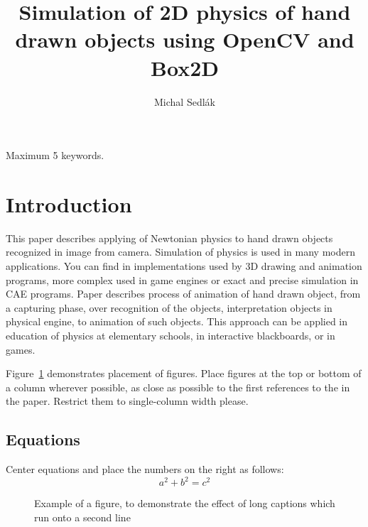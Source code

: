 \documentclass{ifacconf}
\begin{document}
\begin{frontmatter}
\title{Simulation of 2D physics of hand drawn objects using OpenCV and Box2D}
\author[Bratislava]{Michal Sedlák}
\address[Bratislava]{Faculty of Electrical Engineering and Information Technology, Slovak University of Technology,
Ilkovičova 3, 812 19 Bratislava, Slovakia
\\
(e-mail: michal.sedlak@stuba.sk)}
\begin{abstract}

\end{abstract}
\begin{keyword}
Maximum 5 keywords.
\end{keyword}
\end{frontmatter}

\section{Introduction}
This paper describes applying of Newtonian physics to hand drawn objects
recognized in image from camera. Simulation of physics is used in many modern applications. You can find in implementations used by 3D drawing and animation programs, more complex used in game engines or exact and precise simulation in CAE programs. Paper describes process of animation of hand drawn object, from a capturing phase, over recognition of the objects, interpretation objects in physical engine, to animation of such objects. This approach can be applied in education of physics at elementary schools, in interactive blackboards, or in games.



Figure~\ref{fig:song} demonstrates placement of figures. Place figures at
the top or bottom of a column wherever possible, as close as possible
to the first references to the in the paper. Restrict them to
single-column width please.

\subsection{Equations}
Center equations and place the numbers on the right as follows:
\begin{equation}
a^2+b^2=c^2
\end{equation}

\begin{figure}
\vspace*{3cm}
\caption{Example of a figure, to demonstrate the effect of
  long captions which run onto a second line}
\label{fig:song}
\end{figure}
\end{document}
